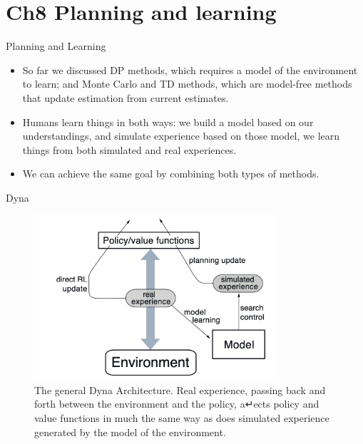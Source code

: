 \documentclass[handout]{beamer}
\begin{document}
\section{Ch8 Planning and learning}
\begin{frame}{Planning and Learning}
\small
\begin{itemize}[<+(1)->]
	\item So far we discussed DP methods, which requires a model of the environment to learn; and Monte Carlo and TD methods, which are model-free methods that update estimation from current estimates.
	\item Humans learn things in both ways: we build a model based on our understandings, and simulate experience based on those model, we learn things from both simulated and real experiences.
	\item We can achieve the same goal by combining both types of methods.
\end{itemize}
\end{frame}

\begin{frame}{Dyna \cite{sutton2018reinforcement}}
\begin{figure}
	\centering
	\caption{The general Dyna Architecture. Real experience, passing back and forth between the environment and the policy, a↵ects policy and value functions in much the same way as does simulated experience generated by the model of the environment.}
	\includegraphics[width=0.8\textwidth]{images/planning.png}
\end{figure}
\end{frame}

\end{document}
